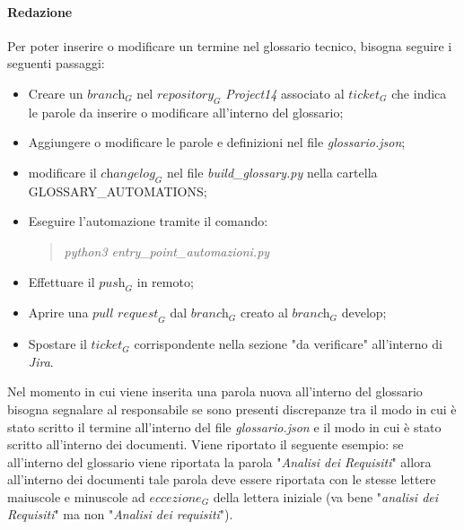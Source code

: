 \paragraph{Redazione}
Per poter inserire o modificare un termine nel glossario tecnico, bisogna seguire i seguenti passaggi:
\begin{itemize}
    \item Creare un $\textit{branch}_G$ nel $\textit{repository}_G$ \emph{Project14} associato al $\textit{ticket}_G$ che indica le parole da inserire o modificare all'interno del glossario;
    \item Aggiungere o modificare le parole e definizioni nel file \emph{glossario.json};
    \item modificare il $\textit{changelog}_G$ nel file \emph{build\_glossary.py} nella cartella GLOSSARY\_AUTOMATIONS;
    \item Eseguire l'automazione tramite il comando:
        \begin{quote}
            \emph{  python3 entry\_point\_automazioni.py} 
        \end{quote}
    \item Effettuare il $\textit{push}_G$ in remoto;
    \item Aprire una $\textit{pull request}_G$ dal $\textit{branch}_G$ creato al $\textit{branch}_G$ develop;
    \item Spostare il $\textit{ticket}_G$ corrispondente nella sezione "da verificare" all'interno di \emph{Jira}.
\end{itemize}
Nel momento in cui viene inserita una parola nuova all'interno del glossario bisogna segnalare al responsabile se sono presenti discrepanze tra il modo in cui è stato scritto il termine all'interno del file \emph{glossario.json} e il modo in cui è stato scritto all'interno dei documenti. Viene riportato il seguente esempio: se all'interno del glossario viene riportata la parola "\emph{Analisi dei Requisiti}" allora all'interno dei documenti tale parola deve essere riportata con le stesse lettere maiuscole e minuscole ad $\textit{eccezione}_G$ della lettera iniziale (va bene "\emph{analisi dei Requisiti}" ma non "\emph{Analisi dei requisiti}").
